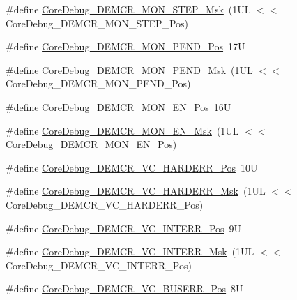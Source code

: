 \begin{DoxyCompactItemize}
\#define \hyperlink{group___c_m_s_i_s___core_debug_ga2ded814556de96fc369de7ae9a7ceb98}{Core\-Debug\-\_\-\-D\-E\-M\-C\-R\-\_\-\-M\-O\-N\-\_\-\-S\-T\-E\-P\-\_\-\-Msk}~(1\-U\-L $<$$<$ Core\-Debug\-\_\-\-D\-E\-M\-C\-R\-\_\-\-M\-O\-N\-\_\-\-S\-T\-E\-P\-\_\-\-Pos)
\item 
\#define \hyperlink{group___c_m_s_i_s___core_debug_ga1e2f706a59e0d8131279af1c7e152f8d}{Core\-Debug\-\_\-\-D\-E\-M\-C\-R\-\_\-\-M\-O\-N\-\_\-\-P\-E\-N\-D\-\_\-\-Pos}~17\-U
\item 
\#define \hyperlink{group___c_m_s_i_s___core_debug_ga68ec55930269fab78e733dcfa32392f8}{Core\-Debug\-\_\-\-D\-E\-M\-C\-R\-\_\-\-M\-O\-N\-\_\-\-P\-E\-N\-D\-\_\-\-Msk}~(1\-U\-L $<$$<$ Core\-Debug\-\_\-\-D\-E\-M\-C\-R\-\_\-\-M\-O\-N\-\_\-\-P\-E\-N\-D\-\_\-\-Pos)
\item 
\#define \hyperlink{group___c_m_s_i_s___core_debug_ga802829678f6871863ae9ecf60a10425c}{Core\-Debug\-\_\-\-D\-E\-M\-C\-R\-\_\-\-M\-O\-N\-\_\-\-E\-N\-\_\-\-Pos}~16\-U
\item 
\#define \hyperlink{group___c_m_s_i_s___core_debug_gac2b46b9b65bf8d23027f255fc9641977}{Core\-Debug\-\_\-\-D\-E\-M\-C\-R\-\_\-\-M\-O\-N\-\_\-\-E\-N\-\_\-\-Msk}~(1\-U\-L $<$$<$ Core\-Debug\-\_\-\-D\-E\-M\-C\-R\-\_\-\-M\-O\-N\-\_\-\-E\-N\-\_\-\-Pos)
\item 
\#define \hyperlink{group___c_m_s_i_s___core_debug_gaed9f42053031a9a30cd8054623304c0a}{Core\-Debug\-\_\-\-D\-E\-M\-C\-R\-\_\-\-V\-C\-\_\-\-H\-A\-R\-D\-E\-R\-R\-\_\-\-Pos}~10\-U
\item 
\#define \hyperlink{group___c_m_s_i_s___core_debug_ga803fc98c5bb85f10f0347b23794847d1}{Core\-Debug\-\_\-\-D\-E\-M\-C\-R\-\_\-\-V\-C\-\_\-\-H\-A\-R\-D\-E\-R\-R\-\_\-\-Msk}~(1\-U\-L $<$$<$ Core\-Debug\-\_\-\-D\-E\-M\-C\-R\-\_\-\-V\-C\-\_\-\-H\-A\-R\-D\-E\-R\-R\-\_\-\-Pos)
\item 
\#define \hyperlink{group___c_m_s_i_s___core_debug_ga22079a6e436f23b90308be97e19cf07e}{Core\-Debug\-\_\-\-D\-E\-M\-C\-R\-\_\-\-V\-C\-\_\-\-I\-N\-T\-E\-R\-R\-\_\-\-Pos}~9\-U
\item 
\#define \hyperlink{group___c_m_s_i_s___core_debug_gad6815d8e3df302d2f0ff2c2c734ed29a}{Core\-Debug\-\_\-\-D\-E\-M\-C\-R\-\_\-\-V\-C\-\_\-\-I\-N\-T\-E\-R\-R\-\_\-\-Msk}~(1\-U\-L $<$$<$ Core\-Debug\-\_\-\-D\-E\-M\-C\-R\-\_\-\-V\-C\-\_\-\-I\-N\-T\-E\-R\-R\-\_\-\-Pos)
\item 
\#define \hyperlink{group___c_m_s_i_s___core_debug_gab8e3d8f0f9590a51bbf10f6da3ad6933}{Core\-Debug\-\_\-\-D\-E\-M\-C\-R\-\_\-\-V\-C\-\_\-\-B\-U\-S\-E\-R\-R\-\_\-\-Pos}~8\-U
\item 
$$
\end{DoxyCompactItemize}

